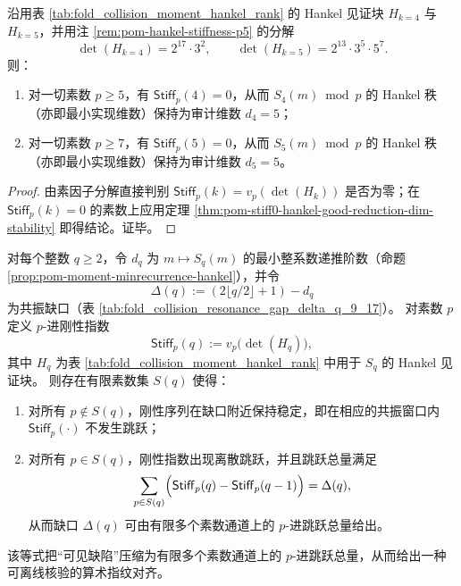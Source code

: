 \begin{corollary}[Fold 碰撞矩的坏素锁定：\texorpdfstring{$k=4,5$}{k=4,5} 的审计维数在几乎所有素数上稳定]\label{cor:pom-fold-collision-moment-bad-primes-locked-by-hankel}
沿用表 \ref{tab:fold_collision_moment_hankel_rank} 的 Hankel 见证块 \(H_{k=4}\) 与 \(H_{k=5}\)，并用注 \ref{rem:pom-hankel-stiffness-p5} 的分解
\[
\det(H_{k=4})=2^{17}\cdot 3^2,
\qquad
\det(H_{k=5})=2^{13}\cdot 3^5\cdot 5^7.
\]
则：
\begin{enumerate}
  \item 对一切素数 \(p\ge 5\)，有 \(\mathsf{Stiff}_p(4)=0\)，从而 \(S_4(m)\bmod p\) 的 Hankel 秩（亦即最小实现维数）保持为审计维数 \(d_4=5\)；
  \item 对一切素数 \(p\ge 7\)，有 \(\mathsf{Stiff}_p(5)=0\)，从而 \(S_5(m)\bmod p\) 的 Hankel 秩（亦即最小实现维数）保持为审计维数 \(d_5=5\)。
\end{enumerate}
\end{corollary}
\begin{proof}
由素因子分解直接判别 \(\mathsf{Stiff}_p(k)=v_p(\det(H_k))\) 是否为零；在 \(\mathsf{Stiff}_p(k)=0\) 的素数上应用定理 \ref{thm:pom-stiff0-hankel-good-reduction-dim-stability} 即得结论。证毕。
\end{proof}

\begin{conjecture}[刚性指数跳跃的有限素数支撑与缺陷量子化对齐]\label{conj:pom-stiffness-jump-quantized-defect}
对每个整数 \(q\ge 2\)，令 \(d_q\) 为 \(m\mapsto S_q(m)\) 的最小整系数递推阶数（命题 \ref{prop:pom-moment-minrecurrence-hankel}），并令
\[
\Delta(q):=(2\lfloor q/2\rfloor+1)-d_q
\]
为共振缺口（表 \ref{tab:fold_collision_resonance_gap_delta_q_9_17}）。
对素数 \(p\) 定义 \(p\)-进刚性指数
\[
\mathsf{Stiff}_p(q):=v_p\!\bigl(\det(H_q)\bigr),
\]
其中 \(H_q\) 为表 \ref{tab:fold_collision_moment_hankel_rank} 中用于 \(S_q\) 的 Hankel 见证块。
则存在有限素数集 \(S(q)\) 使得：
\begin{enumerate}
  \item 对所有 \(p\notin S(q)\)，刚性序列在缺口附近保持稳定，即在相应的共振窗口内 \(\mathsf{Stiff}_p(\cdot)\) 不发生跳跃；
  \item 对所有 \(p\in S(q)\)，刚性指数出现离散跳跃，并且跳跃总量满足
  \[
  \sum_{p\in S(q)}\Bigl(\mathsf{Stiff}_p(q)-\mathsf{Stiff}_p(q-1)\Bigr)=\Delta(q),
  \]
  从而缺口 \(\Delta(q)\) 可由有限多个素数通道上的 \(p\)-进跳跃总量给出。
\end{enumerate}
该等式把“可见缺陷”压缩为有限多个素数通道上的 \(p\)-进跳跃总量，从而给出一种可离线核验的算术指纹对齐。
\end{conjecture}

